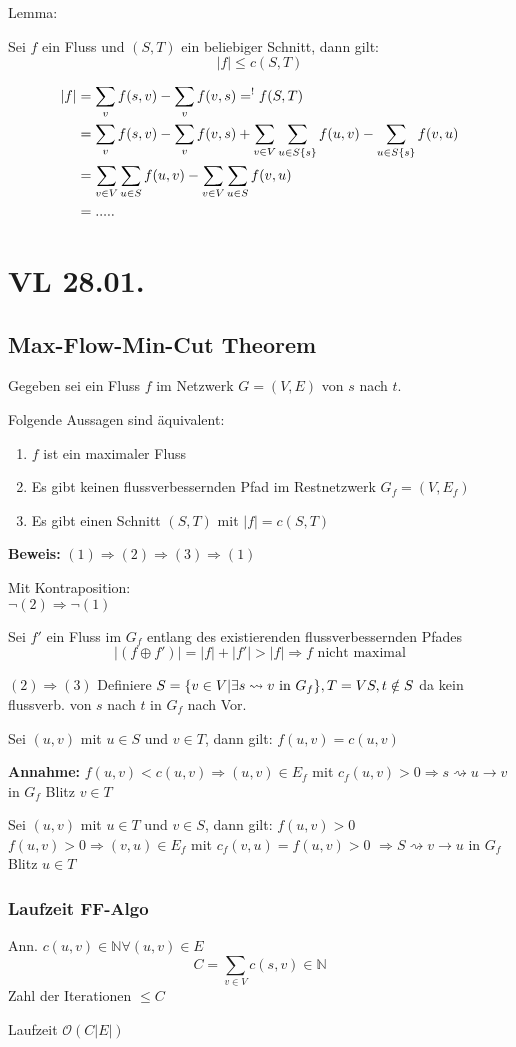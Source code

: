 \documentclass[a4paper,draft,twoside,10pt]{report}
\begin{document}
Lemma:

Sei $f$ ein Fluss und $(S,T)$ ein beliebiger Schnitt, dann gilt:
\[|f|\le c(S,T)\]

\begin{align*}
|f|&= \sum_v f(s,v)-\sum_v f(v,s)=^! f(S,T)\\
&=\sum_v f(s,v)-\sum_v f(v,s) + \sum_{v\in V}\sum_{u\in S\/\{s\}}f(u,v)-\sum_{u\in S\/\{s\}} f(v,u)\\
&=\sum_{v\in V}\sum_{u\in S}f(u,v)-\sum_{v\in V}\sum_{u\in S}f(v,u)\\
&=.....
\end{align*}

\chapter{VL 28.01.}

\section{Max-Flow-Min-Cut Theorem}
Gegeben sei ein Fluss $f$ im Netzwerk $G=(V,E)$ von $s$ nach $t$.

Folgende Aussagen sind äquivalent:
\begin{enumerate}
\item $f$ ist ein maximaler Fluss
\item Es gibt keinen flussverbessernden Pfad im Restnetzwerk $G_f=(V,E_f)$
\item Es gibt einen Schnitt $(S,T)$ mit $|f|=c(S,T)$
\end{enumerate}
\textbf{Beweis:} $(1)\Rightarrow (2)\Rightarrow(3)\Rightarrow(1)$

Mit Kontraposition:\\
$\neg (2)\Rightarrow \neg (1)$

Sei $f'$ ein Fluss im $G_f$ entlang des existierenden flussverbessernden Pfades
\[|(f\oplus f')|=|f|+|f'| > |f|\Rightarrow f \mbox{ nicht maximal}\]

$(2)\Rightarrow (3)$
Definiere $S=\{v\in V | \exists s \rightsquigarrow v \mbox{ in } G_f\},T=V\/S, t\notin S$ da kein flussverb. von $s$ nach $t$ in $G_f$ nach Vor.

Sei $(u,v)$ mit $u\in S$ und $v\in T$, dann gilt: $f(u,v) =c(u,v)$

\textbf{Annahme:} $f(u,v)<c(u,v)\Rightarrow (u,v) \in E_f$ mit $c_f(u,v)>0 \Rightarrow s\rightsquigarrow u\rightarrow v$ in $G_f$ Blitz $v\in T$

Sei $(u,v)$ mit $u\in T$ und $v \in S$, dann gilt: $f(u,v)>0$
$f(u,v)>0 \Rightarrow (v,u) \in E_f$ mit $c_f (v,u) =f(u,v)>0$
$\Rightarrow S\rightsquigarrow v\rightarrow u$ in $G_f$ Blitz $u\in T$

\subsection{Laufzeit FF-Algo}
Ann. $c(u,v)\in \mathbb N \forall (u,v)\in E$
\[C=\sum_{v\in V} c(s,v)\in \mathbb N \]
Zahl der Iterationen $\leq C$

Laufzeit $\mathcal O(C|E|)$
\end{document}
